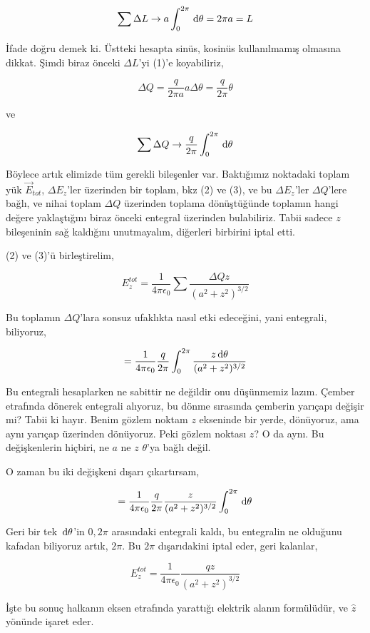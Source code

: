\documentclass[12pt,fleqn]{article}\usepackage{../../common}
\begin{document}
$$
\sum \Delta L \to a \int_{0}^{2\pi} \,\mathrm{d} \theta = 2\pi a = L
$$

İfade doğru demek ki. Üstteki hesapta sinüs, kosinüs kullanılmamış olmasına
dikkat. Şimdi biraz önceki $\Delta L$'yi (1)'e koyabiliriz,

$$
\Delta Q = \frac{q}{2\pi a} a \Delta \theta = \frac{q}{2 \pi} \theta
$$                              

ve

$$
\sum \Delta Q \to \frac{q}{2\pi} \int_{0}^{2\pi} \,\mathrm{d} \theta
$$

Böylece artık elimizde tüm gerekli bileşenler var. Baktığımız noktadaki toplam
yük $\vec{E}_{tot}$, $\Delta E_z$'ler üzerinden bir toplam, bkz (2) ve (3), ve
bu $\Delta E_z$'ler $\Delta Q$'lere bağlı, ve nihai toplam $\Delta Q$ üzerinden
toplama dönüştüğünde toplamın hangi değere yaklaştığını biraz önceki entegral
üzerinden bulabiliriz. Tabii sadece $z$ bileşeninin sağ kaldığını unutmayalım,
diğerleri birbirini iptal etti. 

(2) ve (3)'ü birleştirelim,

$$
E_{z}^{tot} = 
\frac{1}{4\pi\epsilon_0 }
\sum 
\frac{\Delta Q z}{(a^2 + z^2)^{3/2}}
$$

Bu toplamın $\Delta Q$'lara sonsuz ufaklıkta nasıl etki edeceğini, yani
entegrali, biliyoruz,

$$
= \frac{1}{4\pi\epsilon_0 }
\frac{q}{2\pi}
\int_{0}^{2\pi} \frac{z \,\mathrm{d} \theta}{(a^2 + z^2)^{3/2}  }
$$

Bu entegrali hesaplarken ne sabittir ne değildir onu düşünmemiz lazım. Çember
etrafında dönerek entegrali alıyoruz, bu dönme sırasında çemberin yarıçapı
değişir mi? Tabii ki hayır. Benim gözlem noktam $z$ ekseninde bir yerde,
dönüyoruz, ama aynı yarıçap üzerinden dönüyoruz. Peki gözlem noktası $z$? O da
aynı. Bu değişkenlerin hiçbiri, ne $a$ ne $z$ $\theta$'ya bağlı değil.

O zaman bu iki değişkeni dışarı çıkartırsam,

$$
= \frac{1}{4\pi\epsilon_0 }
\frac{q}{2\pi}
\frac{z}{(a^2 + z^2)^{3/2}}
\int_{0}^{2\pi} \,\mathrm{d} \theta 
$$

Geri bir tek $\,\mathrm{d} \theta$'in $0,2\pi$ arasındaki entegrali kaldı, bu entegralin
ne olduğunu kafadan biliyoruz artık, $2\pi$. Bu $2\pi$ dışarıdakini iptal eder,
geri kalanlar,

$$
E_{z}^{tot} = 
\frac{1}{4\pi\epsilon_0 }
\frac{qz}{(a^2 + z^2)^{3/2}}
$$

İşte bu sonuç halkanın eksen etrafında yarattığı elektrik alanın formülüdür, ve
$\hat{z}$ yönünde işaret eder. 
\end{document}
